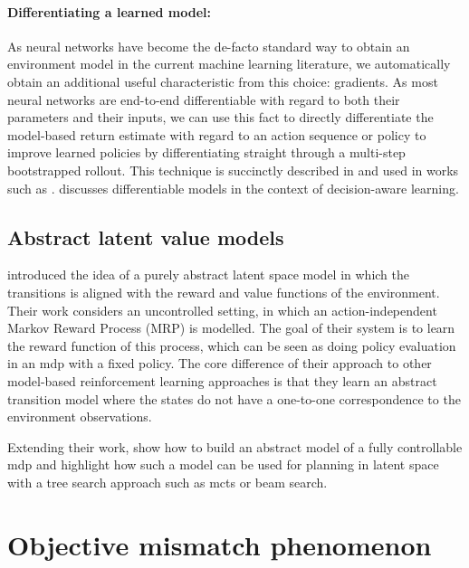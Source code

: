\paragraph{Differentiating a learned model:} As neural networks have become the de-facto standard way to obtain an environment model in the current machine learning literature, we automatically obtain an additional useful characteristic from this choice: gradients.
As most neural networks are end-to-end differentiable with regard to both their parameters and their inputs, we can use this fact to directly differentiate the model-based return estimate with regard to an action sequence or policy to improve learned policies by differentiating straight through a multi-step bootstrapped rollout.
This technique is succinctly described in \textcite{amos2021model} and used in works such as \textcite{hafner2020dream}.
\textcite{voelcker2022value} discusses differentiable models in the context of decision-aware learning.

\subsection{Abstract latent value models}

\textcite{silver2017predictron} introduced the idea of a purely abstract latent space model in which the transitions is aligned with the reward and value functions of the environment.
Their work considers an uncontrolled setting, in which an action-independent Markov Reward Process (MRP) is modelled.
The goal of their system is to learn the reward function of this process, which can be seen as doing policy evaluation in an \ac{mdp}  with a fixed policy.
The core difference of their approach to other model-based reinforcement learning approaches is that they learn an abstract transition model where the states do not have a one-to-one correspondence to the environment observations.

Extending their work, \textcite{oh2017value} show how to build an abstract model of a fully controllable \ac{mdp}  and highlight how such a model can be used for planning in latent space with a tree search approach such as \ac{mcts} \parencite{schrittwieser2020mastering} or beam search.

\section{Objective mismatch phenomenon}

\label{chap:background:objective}

